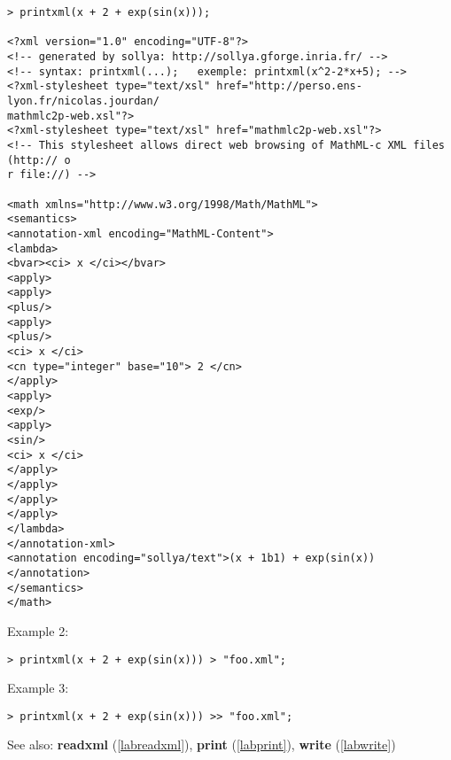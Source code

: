 \begin{center}\begin{minipage}{15cm}\begin{Verbatim}[frame=single]
> printxml(x + 2 + exp(sin(x)));

<?xml version="1.0" encoding="UTF-8"?>
<!-- generated by sollya: http://sollya.gforge.inria.fr/ -->
<!-- syntax: printxml(...);   exemple: printxml(x^2-2*x+5); -->
<?xml-stylesheet type="text/xsl" href="http://perso.ens-lyon.fr/nicolas.jourdan/
mathmlc2p-web.xsl"?>
<?xml-stylesheet type="text/xsl" href="mathmlc2p-web.xsl"?>
<!-- This stylesheet allows direct web browsing of MathML-c XML files (http:// o
r file://) -->

<math xmlns="http://www.w3.org/1998/Math/MathML">
<semantics>
<annotation-xml encoding="MathML-Content">
<lambda>
<bvar><ci> x </ci></bvar>
<apply>
<apply>
<plus/>
<apply>
<plus/>
<ci> x </ci>
<cn type="integer" base="10"> 2 </cn>
</apply>
<apply>
<exp/>
<apply>
<sin/>
<ci> x </ci>
</apply>
</apply>
</apply>
</apply>
</lambda>
</annotation-xml>
<annotation encoding="sollya/text">(x + 1b1) + exp(sin(x))</annotation>
</semantics>
</math>

\end{Verbatim}
\end{minipage}\end{center}
\noindent Example 2: 
\begin{center}\begin{minipage}{15cm}\begin{Verbatim}[frame=single]
> printxml(x + 2 + exp(sin(x))) > "foo.xml";
\end{Verbatim}
\end{minipage}\end{center}
\noindent Example 3: 
\begin{center}\begin{minipage}{15cm}\begin{Verbatim}[frame=single]
> printxml(x + 2 + exp(sin(x))) >> "foo.xml";
\end{Verbatim}
\end{minipage}\end{center}
See also: \textbf{readxml} (\ref{labreadxml}), \textbf{print} (\ref{labprint}), \textbf{write} (\ref{labwrite})

